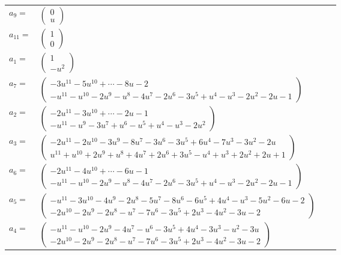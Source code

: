 \documentclass[1p]{elsarticle_modified}
\theoremstyle{definition}
\begin{document}
\begin{tabular}{m{7pt} m{180pt} m{7pt} m{180pt} }
\flushright $a_{9}=$&$\begin{pmatrix}0\\u\end{pmatrix}$ \\
\flushright $a_{11}=$&$\begin{pmatrix}1\\0\end{pmatrix}$ \\
\flushright $a_{1}=$&$\begin{pmatrix}1\\- u^2\end{pmatrix}$ \\
\flushright $a_{7}=$&$\begin{pmatrix}-3 u^{11}-5 u^{10}+\cdots-8 u-2\\- u^{11}- u^{10}-2 u^9- u^8-4 u^7-2 u^6-3 u^5+u^4- u^3-2 u^2-2 u-1\end{pmatrix}$ \\
\flushright $a_{2}=$&$\begin{pmatrix}-2 u^{11}-3 u^{10}+\cdots-2 u-1\\- u^{11}- u^9-3 u^7+u^6- u^5+u^4- u^3-2 u^2\end{pmatrix}$ \\
\flushright $a_{3}=$&$\begin{pmatrix}-2 u^{11}-2 u^{10}-3 u^9-8 u^7-3 u^6-3 u^5+6 u^4-7 u^3-3 u^2-2 u\\u^{11}+u^{10}+2 u^9+u^8+4 u^7+2 u^6+3 u^5- u^4+u^3+2 u^2+2 u+1\end{pmatrix}$ \\
\flushright $a_{6}=$&$\begin{pmatrix}-2 u^{11}-4 u^{10}+\cdots-6 u-1\\- u^{11}- u^{10}-2 u^9- u^8-4 u^7-2 u^6-3 u^5+u^4- u^3-2 u^2-2 u-1\end{pmatrix}$ \\
\flushright $a_{5}=$&$\begin{pmatrix}- u^{11}-3 u^{10}-4 u^9-2 u^8-5 u^7-8 u^6-6 u^5+4 u^4- u^3-5 u^2-6 u-2\\-2 u^{10}-2 u^9-2 u^8- u^7-7 u^6-3 u^5+2 u^3-4 u^2-3 u-2\end{pmatrix}$ \\
\flushright $a_{4}=$&$\begin{pmatrix}- u^{11}- u^{10}-2 u^9-4 u^7- u^6-3 u^5+4 u^4-3 u^3- u^2-3 u\\-2 u^{10}-2 u^9-2 u^8- u^7-7 u^6-3 u^5+2 u^3-4 u^2-3 u-2\end{pmatrix}$ \\

\end{tabular}
\end{document}
